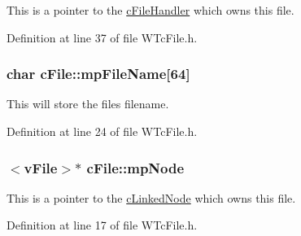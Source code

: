 This is a pointer to the \hyperlink{classc_file_handler}{cFileHandler} which owns this file. 



Definition at line 37 of file WTcFile.h.

\hypertarget{classc_file_a5e3add41cacddcc489ca9aa185e3b066}{
\subsubsection[{mpFileName}]{\setlength{\rightskip}{0pt plus 5cm}char {\bf cFile::mpFileName}\mbox{[}64\mbox{]}}}
\label{classc_file_a5e3add41cacddcc489ca9aa185e3b066}


This will store the files filename. 



Definition at line 24 of file WTcFile.h.

\hypertarget{classc_file_aed51bea596b50e6c8a03dd1593298681}{
\subsubsection[{mpNode}]{$<${\bf vFile}$>$$\ast$ {\bf cFile::mpNode}}}
\label{classc_file_aed51bea596b50e6c8a03dd1593298681}


This is a pointer to the \hyperlink{classc_linked_node}{cLinkedNode} which owns this file. 



Definition at line 17 of file WTcFile.h.

